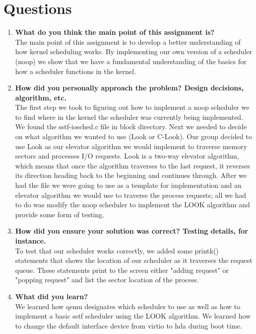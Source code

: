 \documentclass[letterpaper,10pt,notitlepage,fleqn]{article}
\begin{document}
\section{Questions}
\begin{enumerate}
\item \textbf{What do you think the main point of this assignment is?}
\\	The main point of this assignment is to develop a better understanding of how kernel scheduling works. By implementing our own version of a scheduler (noop) we show that we have a fundamental understanding of the basics for how a scheduler functions in the kernel. 

\item \textbf{How did you personally approach the problem? Design decisions, algorithm, etc.}
\\ The first step we took to figuring out how to implement a noop scheduler we to find where in the kernel the scheduler was currently being implemented. We found the sstf-iosched.c file in block directory. Next we needed to decide on what algorithm we wanted to use (Look or C-Look). Our group decided to use Look as our elevator algorithm we would implement to traverse memory sectors and processes I/O requests. Look is a two-way elevator algorithm, which means that once the algorithm traverses to the last request, it reverses its direction heading back to the beginning and continues through. After we had the file we were going to use as a template for implementation and an elevator algorithm we would use to traverse the process requests; all we had to do was modify the noop scheduler to implement the LOOK algorithm and provide some form of testing. 

\item \textbf{How did you ensure your solution was correct? Testing details, for instance.}
\\ To test that our scheduler works correctly, we added some printk() statements that shows the location of our scheduler as it traverses the request queue. These statements print to the screen either "adding request" or "popping request" and list the sector location of the process.

\item \textbf{What did you learn?}
\\ We learned how qemu designates which scheduler to use as well as how to implement a basic sstf scheduler using the LOOK algorithm. We learned how to change the default interface device from virtio to hda during boot time. 


\end{enumerate}
\end{document}
